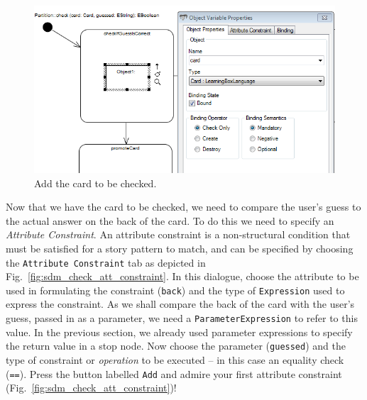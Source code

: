 \begin{figure}[htbp]
\begin{center}
  \includegraphics[width=\textwidth]{pics/sdmBilder/check/sdm17RAW}
  \caption{Add the card to be checked.}  
  \label{fig:sdm_check_addCard}
\end{center}
\end{figure}

Now that we have the card to be checked, we need to compare the user's guess to
the actual answer on the back of the card.  To do this we need to specify an
\emph{Attribute Constraint}.  An attribute constraint is a
non-structural condition that must be satisfied for a story pattern to match,
and can be specified by choosing the \texttt{Attribute Constraint} tab as
depicted in Fig.~\ref{fig:sdm_check_att_constraint}.  In this dialogue, choose
the attribute to be used in formulating the constraint (\texttt{back}) and the
type of \texttt{Expression} used to express the constraint.  As we shall compare
the back of the card with the user's guess, passed in as a parameter, we need a
\texttt{ParameterExpression} to refer to this value.  In the previous section,
we already used parameter expressions to specify the return value in a stop
node.  Now choose the parameter (\texttt{guessed}) and the type of
constraint or \emph{operation} to be executed -- in this case an equality check
(\texttt{==}). Press the button labelled \texttt{Add} and admire your first
attribute constraint (Fig.~\ref{fig:sdm_check_att_constraint})!


